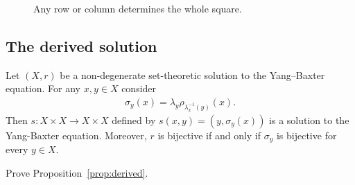     \begin{figure}[h!]
    \centering
        \hspace{1cm}
        \caption{Any row or column determines the whole square.}
        \label{fig:braid}
    \end{figure}



\subsection{The derived solution}
   
    \begin{proposition}\label{prop:derived}
        Let $(X,r)$ be a non-degenerate set-theoretic solution to the Yang--Baxter equation. For any $x,y\in X$ consider
        \begin{align*}
            \sigma_{y}(x)= \lambda_y\rho_{\lambda_x^{-1}(y)}(x).
        \end{align*}
        Then $s:X\times X\to X \times X$ defined by $s(x,y) =(y,\sigma_y(x))$ is a solution to the Yang-Baxter equation.
        Moreover, $r$ is bijective if and only if $\sigma_y$ is bijective for every $y\in X$.
    \end{proposition}
    
    \begin{exercise}\label{ex:derived}
        Prove Proposition~\ref{prop:derived}.
    \end{exercise}
    
